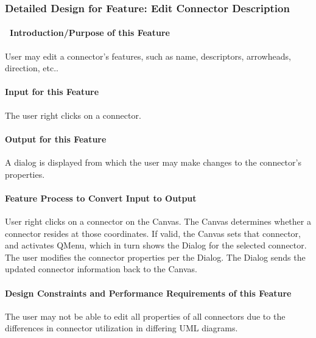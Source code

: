 \documentclass[twoside,letterpaper]{article}
\begin{document}
{\clearpage




% 
%

\subsubsection{Detailed Design for Feature: Edit Connector Description}

\paragraph[\ Introduction/Purpose of this Feature]
{\ Introduction/Purpose of this Feature}
{
User may edit a connector{\textquoteright}s features, such as name, descriptors, arrowheads, direction, etc..
}

\paragraph[Input for this Feature]{Input for this Feature}
{
The user right clicks on a connector.
}

\paragraph{Output for this Feature}
{
A dialog is displayed from which the user may make changes to the connector{\textquoteright}s properties.
}

\paragraph{Feature Process to Convert Input to Output}
{
User right clicks on a connector on the Canvas. The Canvas determines whether a connector resides at those coordinates. If valid, the Canvas sets that connector, and activates QMenu, which in turn shows the Dialog for the selected connector.
The user modifies the connector properties per the Dialog.  The Dialog sends the updated connector information back to the Canvas.
}

\paragraph{Design Constraints and Performance Requirements of this Feature}
{
The user may not be able to edit all properties of all connectors due to the differences in connector utilization in differing UML diagrams.
}
\bigskip
\bigskip

}
\end{document}
